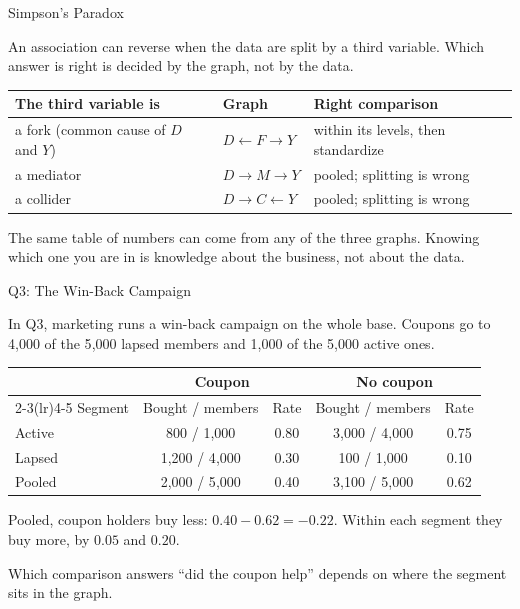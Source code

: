 \documentclass[aspectratio=169, 11pt, handout]{beamer}
\begin{document}
\begin{frame}{Simpson's Paradox}

An association can reverse when the data are split by a third variable. Which answer is right is decided by the graph, not by the data.

\bigskip

\begin{center}
\begin{tabular}{lll}
\toprule
\textbf{The third variable is} & \textbf{Graph} & \textbf{Right comparison} \\
\midrule
a fork (common cause of $D$ and $Y$) & $D \leftarrow F \to Y$ & within its levels, then standardize \\
a mediator & $D \to M \to Y$ & pooled; splitting is wrong \\
a collider & $D \to C \leftarrow Y$ & pooled; splitting is wrong \\
\bottomrule
\end{tabular}
\end{center}

\bigskip

The same table of numbers can come from any of the three graphs. Knowing which one you are in is knowledge about the business, not about the data.
\end{frame}

\begin{frame}{Q3: The Win-Back Campaign}

In Q3, marketing runs a win-back campaign on the whole base. Coupons go to 4{,}000 of the 5{,}000 lapsed members and 1{,}000 of the 5{,}000 active ones.

\begin{center}
\small
\begin{tabular}{lcccc}
\toprule
 & \multicolumn{2}{c}{Coupon} & \multicolumn{2}{c}{No coupon} \\
\cmidrule(lr){2-3}\cmidrule(lr){4-5}
Segment & Bought / members & Rate & Bought / members & Rate \\
\midrule
Active & 800 / 1{,}000 & 0.80 & 3{,}000 / 4{,}000 & 0.75 \\
Lapsed & 1{,}200 / 4{,}000 & 0.30 & 100 / 1{,}000 & 0.10 \\
\midrule
Pooled & 2{,}000 / 5{,}000 & 0.40 & 3{,}100 / 5{,}000 & 0.62 \\
\bottomrule
\end{tabular}
\end{center}

\bigskip

Pooled, coupon holders buy less: $0.40 - 0.62 = -0.22$. Within each segment they buy more, by $0.05$ and $0.20$.

\medskip

Which comparison answers ``did the coupon help'' depends on where the segment sits in the graph.
\end{frame}
\end{document}
